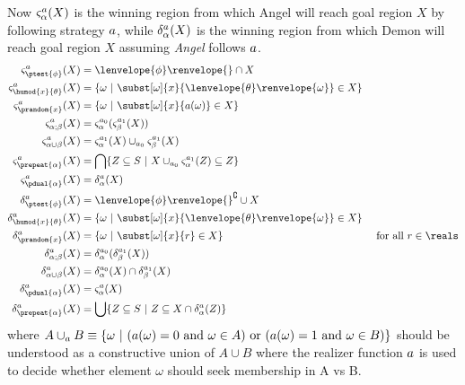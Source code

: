 \documentclass[12pt]{cmuthesis}
\theoremstyle{definition}
\theoremstyle{remark}
\newcommand{\om}{\omega}
\newcommand{\tint}[2]{\lenvelope{#1}\renvelope{#2}}
\newcommand{\fint}[1]{\lenvelope{#1}\renvelope}
\begin{document}
Now $\strategyforR[\alpha]{\aa}{X}$ is the winning region from which Angel will reach goal region $X$ by following strategy $\aa$, while 
$\dstrategyforR[\alpha]{\aa}{X}$ is the winning region from which Demon will reach goal region $X$ assuming \emph{Angel} follows $\aa$.
\begin{align*}
\strategyforR[\ptest{\phi}]{\aa}{X}           &= \fint{\phi}{} \cap X &&\text{}\\ 
\strategyforR[\humod{x}{\theta}]{\aa}{X} &=  \{\om~|~\subst[\om]{x}{\tint{\theta}{\om}} \in X\}&&\text{}\\ 
\strategyforR[\prandom{x}]{\aa}{X}         &=  \{\om~|~\subst[\om]{x}{\aa(\om)} \in X\}&&\text{}\\ 
\strategyforR[\alpha;\beta]{\aa}{X}          &= \strategyforR[\alpha]{\rzFst{\aa}}{\strategyforR[\beta]{\rzSnd{\aa}}{X}} &&\text{}\\ 
\strategyforR[\alpha\cup\beta]{\aa}{X}     &= \strategyforR[\alpha]{\rzSnd{\aa}}{X} \cup_{\rzFst{\aa}} \strategyforR[\beta]{\rzSnd{\aa}}{X}&&\text{}\\ 
\strategyforR[\prepeat{\alpha}]{\aa}{X}     &=  \bigcap\{Z\subseteq S~|~X \cup_{\rzFst{\aa}} \strategyforR[\alpha]{\rzSnd{\aa}}{Z} \subseteq Z\}&&\text{}\\ 
\strategyforR[\pdual{\alpha}]{\aa}{X}        &=  \dstrategyforR[\alpha]{\aa}{X}&&\text{}\\ 
\dstrategyforR[\ptest{\phi}]{\aa}{X}           &= \fint{\phi}{}^\complement \cup X &&\text{}\\ 
\dstrategyforR[\humod{x}{\theta}]{\aa}{X} &= \{\om~|~\subst[\om]{x}{\tint{\theta}{\om}} \in X\} &&\text{}\\ 
\dstrategyforR[\prandom{x}]{\aa}{X}         &= \{\om~|~\subst[\om]{x}{r} \in X\}&&\text{ for all }r \in \reals\\ 
\dstrategyforR[\alpha;\beta]{\aa}{X}          &= \dstrategyforR[\alpha]{\rzFst{\aa}}{\dstrategyforR[\beta]{\rzSnd{\aa}}{X}} &&\text{}\\ 
\dstrategyforR[\alpha\cup\beta]{\aa}{X}     &= \dstrategyforR[\alpha]{\rzFst{\aa}}{X} \cap \dstrategyforR[\beta]{\rzSnd{\aa}}{X}&&\text{}\\ 
\dstrategyforR[\pdual{\alpha}]{\aa}{X}      &= \strategyforR[\alpha]{\aa}{X}&&\text{}\\ 
\dstrategyforR[\prepeat{\alpha}]{\aa}{X}   &= \bigcup\{Z\subseteq S~|~Z \subseteq X \cap \dstrategyforR[\alpha]{\aa}{Z}\}&&\text{}
\end{align*}
where $A \cup_\aa B \equiv \{\om~|~ (\aa(\om)=0\text{ and } \om \in A) \text{ or }(\aa(\om)=1\text{ and } \om \in B)\}$ should be understood as a constructive union of $A \cup B$ where the realizer function $\aa$ is used to decide whether element $\om$ should seek membership in A vs B.
\end{document}
